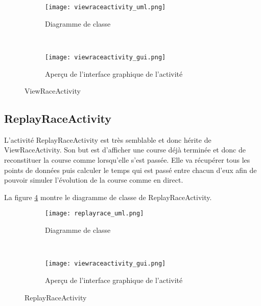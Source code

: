 \begin{figure}[htb!]
    \centering
    \begin{subfigure}[htb]{0.49\textwidth}
		\texttt{[image: viewraceactivity\_uml.png]} 
		\caption{Diagramme de classe}
		\label{fig:viewraceactivity_uml}
    \end{subfigure}
    ~ %
    \begin{subfigure}[htb]{0.49\textwidth}
		\texttt{[image: viewraceactivity\_gui.png]} 
		\caption{Aperçu de l'interface graphique de l'activité}
		\label{fig:viewraceactivity_gui}
    \end{subfigure}
    \caption{ViewRaceActivity}\label{fig:viewraceactivity_fig}
\end{figure}

\subsection{ReplayRaceActivity}

L'activité ReplayRaceActivity est très semblable et donc hérite de ViewRaceActivity. Son but est d'afficher une course déjà terminée et donc de reconstituer la course comme lorsqu'elle s'est passée. Elle va récupérer tous les points de données puis calculer le temps qui est passé entre chacun d'eux afin de pouvoir simuler l'évolution de la course comme en direct.

La figure \ref{fig:replayrace_uml} montre le diagramme de classe de ReplayRaceActivity.

\begin{figure}[htb!]
    \centering
    \begin{subfigure}[htb]{0.49\textwidth}
		\texttt{[image: replayrace\_uml.png]} 
		\caption{Diagramme de classe}
		\label{fig:replayrace_uml}
    \end{subfigure}
    ~ %
    \begin{subfigure}[htb]{0.49\textwidth}
		\texttt{[image: viewraceactivity\_gui.png]} 
		\caption{Aperçu de l'interface graphique de l'activité}
		\label{fig:replayrace_gui}
    \end{subfigure}
    \caption{ReplayRaceActivity}\label{fig:replayrace_fig}
\end{figure}

